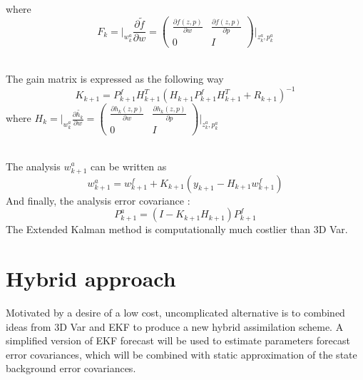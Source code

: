 \documentclass[a4,12pt]{article}
\numberwithin{equation}{section}
\begin{document}
where 
\begin{equation}
F_k = \big|_{w_k^a} \frac{\partial \tilde{f} }{ \partial w } = 
\begin{pmatrix}
\frac{\partial f(z,p)}{\partial w } & \frac{\partial f(z,p)}{ \partial p}\\
0 & I 
\end{pmatrix}  \big|_{{z_k^a},{ p_k^a}}
\label{EKFF}
\end{equation}

~~\\
The gain matrix is expressed as the following way
\begin{equation}
K_{k+1} = P_{k+1}^f H_{k+1}^T (H_{k+1} P_{k+1}^f H_{k+1}^T + R_{k+1}) ^{-1}
\end{equation}
where  $H_k = \big|_{w_k^a} \frac{\partial \tilde{h_k} }{ \partial w } = 
\begin{pmatrix}
\frac{\partial h_k(z,p)}{\partial w } & \frac{\partial h_k(z,p)}{ \partial p}\\
0 & I 
\end{pmatrix}  \big|_{{z_k^a},{ p_k^a}}$

~~\\
The analysis $w_{k+1}^a$ can be written as 
\begin{equation}
    w_{k+1}^a = w_{k+1}^f + K_{k+1} (y_{k+1} - H_{k+1} w_{k+1}^f)
\end{equation}
And finally, the analysis error covariance :
\begin{equation}
    P_{k+1}^a = (I - K_{k+1} H_{k+1} ) P_{k+1}^f
\end{equation}
The Extended Kalman method is computationally much costlier than 3D Var.  

\section{Hybrid approach}
Motivated by a desire of a low cost, uncomplicated alternative is to combined ideas from 3D Var and EKF to produce a new hybrid assimilation scheme. A simplified version of EKF forecast will be used to estimate parameters forecast error covariances, which will be combined with static approximation of the state background error covariances.
\end{document}
